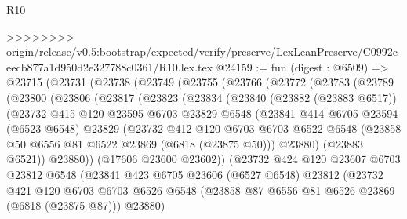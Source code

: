 \begin{lexlean}{R10}
\begin{coremodule}
{{{{{{{{{{{{{{{{{{{{{{{{{{{{{{{{{{{{{{{{{{{{{{{{{{{{{{{{{{{{{{{{{{{{{{{{{{{{{{{{{{{{>>>>>>>> origin/release/v0.5:bootstrap/expected/verify/preserve/LexLeanPreserve/C0992ceecb877a1d950d2e327788c0361/R10.lex.tex
@24159 := fun (digest : @6509) =>
  @23715
    (@23731
      (@23738
        (@23749
          (@23755
            (@23766
              (@23772
                (@23783
                  (@23789
                    (@23800
                      (@23806
                        (@23817
                          (@23823
                            (@23834
                              (@23840
                                (@23882 (@23883 @6517))
                                (@23732
                                  @415
                                  @120
                                  @23595
                                  @6703
                                  @23829
                                  @6548
                                  (@23841
                                    @414
                                    @6705
                                    @23594
                                    (@6523 @6548)
                                    @23829
                                    (@23732
                                      @412
                                      @120
                                      @6703
                                      @6703
                                      @6522
                                      @6548
                                      (@23858 @50 @6556 @81 @6522 @23869 (@6818 (@23875 @50)))
                                      @23880)
                                    (@23883 @6521))
                                  @23880))
                              (@17606 @23600 @23602))
                            (@23732
                              @424
                              @120
                              @23607
                              @6703
                              @23812
                              @6548
                              (@23841
                                @423
                                @6705
                                @23606
                                (@6527 @6548)
                                @23812
                                (@23732
                                  @421
                                  @120
                                  @6703
                                  @6703
                                  @6526
                                  @6548
                                  (@23858 @87 @6556 @81 @6526 @23869 (@6818 (@23875 @87)))
                                  @23880)
}}}}}}}}}}}}}}}}}}}}}}}}}}}}}}}}}}}}}}}}}}}}}}}}}}}}}}}}}}}}}}}}}}}}}}}}}}}}}}}}}}}}
\end{coremodule}
\end{lexlean}
